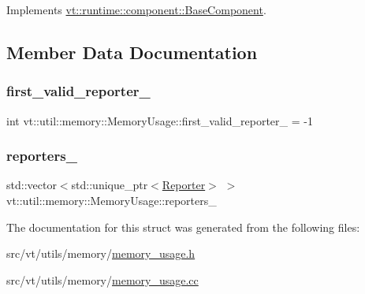 Implements \hyperlink{structvt_1_1runtime_1_1component_1_1_base_component_a7701485f3539f78d42e6bad47fc7eb78}{vt\+::runtime\+::component\+::\+Base\+Component}.



\subsection{Member Data Documentation}
\mbox{\label{structvt_1_1util_1_1memory_1_1_memory_usage_a714d3de79740091fce1761c7c0a858bd}} 
\subsubsection{\texorpdfstring{first\+\_\+valid\+\_\+reporter\+\_\+}{first\_valid\_reporter\_}}
{\footnotesize\ttfamily int vt\+::util\+::memory\+::\+Memory\+Usage\+::first\+\_\+valid\+\_\+reporter\+\_\+ = -\/1\hspace{0.3cm}{\ttfamily [private]}}

\mbox{\label{structvt_1_1util_1_1memory_1_1_memory_usage_afe2db27e57d4fb6f0356c06a376cd568}} 
\subsubsection{\texorpdfstring{reporters\+\_\+}{reporters\_}}
{\footnotesize\ttfamily std\+::vector$<$std\+::unique\+\_\+ptr$<$\hyperlink{structvt_1_1util_1_1memory_1_1_reporter}{Reporter}$>$ $>$ vt\+::util\+::memory\+::\+Memory\+Usage\+::reporters\+\_\+\hspace{0.3cm}{\ttfamily [private]}}



The documentation for this struct was generated from the following files\+:\begin{DoxyCompactItemize}
\item 
src/vt/utils/memory/\hyperlink{memory__usage_8h}{memory\+\_\+usage.\+h}\item 
src/vt/utils/memory/\hyperlink{memory__usage_8cc}{memory\+\_\+usage.\+cc}\end{DoxyCompactItemize}
